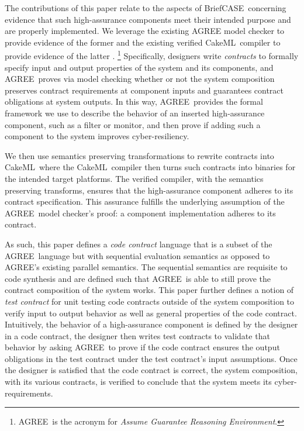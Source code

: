 \documentclass[global,twocolumn]{svjour}
\newcommand{\brfcs}{BriefCASE}
\newcommand{\agr}{AGREE}
\newcommand{\ckml}{CakeML}
\begin{document}
The contributions of this paper relate to the aspects of \brfcs\ concerning evidence that such high-assurance components meet their intended purpose and are properly implemented.
%
We leverage the existing {\agr} model checker to provide evidence of the former and the existing verified \ckml\ compiler to provide evidence of the latter \cite{agree2013,compositional-analysis-agree,nfm:agree,cakeml}.
%
\footnote{\agr\ is the acronym for \emph{Assume Guarantee Reasoning Environment}.}
%
Specifically, designers write \emph{contracts} to formally specify input and output properties of the system and its components, and \agr\ proves via model checking whether or not the system composition preserves contract requirements at component inputs and guarantees contract obligations at system outputs.
%
In this way, \agr\ provides the formal framework we use to describe the behavior of an inserted high-assurance component, such as a filter or monitor, and then prove if adding such a component to the system improves cyber-resiliency.

We then use semantics preserving transformations to rewrite contracts into \ckml\ where the \ckml\ compiler then turns such contracts into binaries for the intended target platforms.
%
The verified compiler, with the semantics preserving transforms, ensures that the high-assurance component adheres to its contract specification.
%
This assurance fulfills the underlying assumption of the \agr\ model checker's proof: a component implementation adheres to its contract.

As such, this paper defines a \emph{code contract} language that is a subset of the \agr\ language but with sequential evaluation semantics as opposed to \agr's existing parallel semantics.
%
The sequential semantics are requisite to code synthesis and are defined such that \agr\ is able to still prove the contract composition of the system works.
%
This paper further defines a notion of \emph{test contract} for unit testing code contracts outside of the system composition to verify input to output behavior as well as general properties of the code contract.
%
Intuitively, the behavior of a high-assurance component is defined by the designer in a code contract, the designer then writes test contracts to validate that behavior by asking \agr\ to prove if the code contract ensures the output obligations in the test contract under the test contract's input assumptions.
%
Once the designer is satisfied that the code contract is correct, the system composition, with its various contracts, is verified to conclude that the system meets its cyber-requirements.
\end{document}
